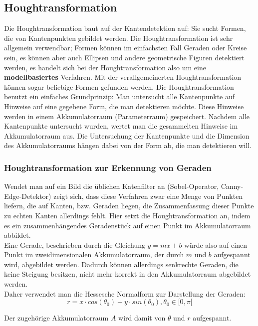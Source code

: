 	\subsection {Houghtransformation}
\cite{ThomasBraeunl1995}
Die Houghtransformation baut auf der Kantendetektion auf: Sie sucht Formen, die von Kantenpunkten gebildet werden.
Die Houghtransformation ist sehr allgemein verwendbar; Formen können im einfachsten Fall Geraden oder Kreise sein, es können aber auch Ellipsen und andere geometrische Figuren detektiert werden, es handelt sich bei der Houghtransformation also um eine \textbf{modellbasiertes} Verfahren.
Mit der verallgemeinerten Houghtransformation können sogar beliebige Formen gefunden werden.
Die Houghtransformation benutzt ein einfaches Grundprinzip: Man untersucht alle Kantenpunkte auf Hinweise auf eine gegebene Form, die man detektieren möchte. Diese Hinweise werden in einem Akkumulatorraum (Parameterraum) gespeichert. Nachdem alle Kantenpunkte untersucht wurden, wertet man die gesammelten Hinweise im Akkumulatorraum aus.
Die Untersuchung der Kantenpunkte und die Dimension des Akkumulatorraums hängen dabei von der Form ab, die man detektieren will.
		\subsubsection{Houghtransformation zur Erkennung von Geraden}
			Wendet man auf ein Bild die üblichen Katenfilter an (Sobel-Operator, Canny-Edge-Detektor) zeigt sich, dass diese Verfahren zwar eine Menge von Punkten liefern, die auf Kanten, bzw. Geraden liegen, die Zusammenfassung dieser Punkte zu echten Kanten allerdings fehlt. Hier setzt die Houghtransformation an, indem es ein zusammenhängendes Geradenstück auf einen Punkt im Akkumulatorraum abbildet. \\
Eine Gerade, beschrieben durch die Gleichung $y = mx + b$ würde also auf einen Punkt im zweidimensionalen Akkumulatorraum, der durch $m$ und $b$ aufgespannt wird, abgebildet werden. Dadurch können allerdings senkrechte Geraden, die keine Steigung besitzen, nicht mehr korrekt in den Akkumulatorraum abgebildet werden. \\
Daher verwendet man die Hessesche Normalform zur Darstellung der Geraden:
\begin{equation*}
r = x \cdot cos (\theta _0) + y \cdot sin (\theta _0) , \theta _0 \in [0, \pi [
\end{equation*}

Der zugehörige Akkumulatorraum $A$ wird damit von $\theta$ und $r$ aufgespannt.

